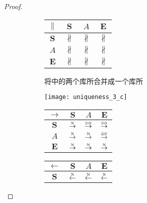 \begin{proof}
\begin{figure}[htbp]
\begin{subfigure}{1\textwidth}
\begin{minipage}[b]{0.3\textwidth}
\begin{tabular}{|c|c|c|c|}
        $\parallel$ & $\bm{S}$ & $A$ & $\bm{E}$\\ \hline
        $\bm{S}$ & $\nparallel$ & $\nparallel$ & $\nparallel$\\ \hline
        $A$ & $\nparallel$ & $\nparallel$ & $\nparallel$\\ \hline
        $\bm{E}$ & $\nparallel$ & $\nparallel$ & $\nparallel$\\ \hline
      \end{tabular}
    \end{minipage}
    \caption{将中的两个库所合并成一个库所}
    \label{fig:uniqueness_3_b}
  \end{subfigure}

  \begin{subfigure}{1\textwidth}
    \vspace{1em}
    \centering
    \begin{minipage}[b]{1\textwidth}
      \centering
      \texttt{[image: uniqueness\_3\_c]}
    \end{minipage}
    \begin{minipage}[b]{0.3\textwidth}
      \vspace{1em}
      \centering
      \begin{tabular}{|c|c|c|c|} \hline
        $\rightarrow$ & $\bm{S}$ & $A$ & $\bm{E}$\\ \hline
        $\bm{S}$ & $\overset{\text{\tiny{N}}}{\rightarrow}$ & $\overset{\text{\tiny{DS}}}{\rightarrow}$ & $\overset{\text{\tiny{DS}}}{\rightarrow}$\\ \hline
        $A$ & $\overset{\text{\tiny{N}}}{\rightarrow}$ & $\overset{\text{\tiny{N}}}{\rightarrow}$ & $\overset{\text{\tiny{DS}}}{\rightarrow}$\\ \hline
        $\bm{E}$ & $\overset{\text{\tiny{N}}}{\rightarrow}$ & $\overset{\text{\tiny{N}}}{\rightarrow}$ & $\overset{\text{\tiny{N}}}{\rightarrow}$\\ \hline
      \end{tabular}
    \end{minipage}
    \begin{minipage}[b]{0.3\textwidth}
      \vspace{1em}
      \centering
      \begin{tabular}{|c|c|c|c|} \hline
        $\leftarrow$ & $\bm{S}$ & $A$ & $\bm{E}$\\ \hline
        $\bm{S}$ & $\overset{\text{\tiny{N}}}{\leftarrow}$ & $\overset{\text{\tiny{N}}}{\leftarrow}$ & $\overset{\text{\tiny{N}}}{\leftarrow}$\\ \hline

\end{tabular}
\end{minipage}
\end{subfigure}
\end{figure}
\end{proof}
